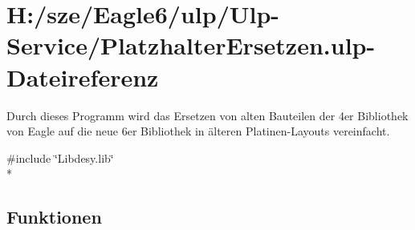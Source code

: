 \hypertarget{_platzhalter_ersetzen_8ulp}{}\section{H\+:/sze/\+Eagle6/ulp/\+Ulp-\/\+Service/\+Platzhalter\+Ersetzen.ulp-\/\+Dateireferenz}
\label{_platzhalter_ersetzen_8ulp}


Durch dieses Programm wird das Ersetzen von alten Bauteilen der 4er Bibliothek von Eagle auf die neue 6er Bibliothek in älteren Platinen-\/\+Layouts vereinfacht.  


{\ttfamily \#include \char`\"{}Libdesy.\+lib\char`\"{}}\\*
\subsection*{Funktionen}
